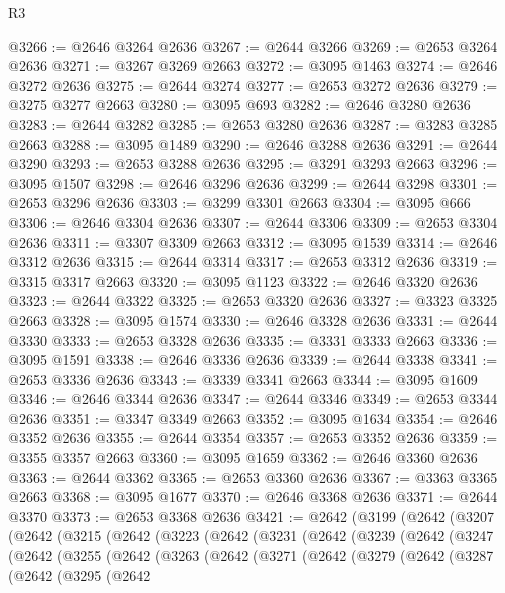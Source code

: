 \begin{lexlean}{R3}
\begin{coremodule}
@3266 := @2646 @3264 @2636
@3267 := @2644 @3266
@3269 := @2653 @3264 @2636
@3271 := @3267 @3269 @2663
@3272 := @3095 @1463
@3274 := @2646 @3272 @2636
@3275 := @2644 @3274
@3277 := @2653 @3272 @2636
@3279 := @3275 @3277 @2663
@3280 := @3095 @693
@3282 := @2646 @3280 @2636
@3283 := @2644 @3282
@3285 := @2653 @3280 @2636
@3287 := @3283 @3285 @2663
@3288 := @3095 @1489
@3290 := @2646 @3288 @2636
@3291 := @2644 @3290
@3293 := @2653 @3288 @2636
@3295 := @3291 @3293 @2663
@3296 := @3095 @1507
@3298 := @2646 @3296 @2636
@3299 := @2644 @3298
@3301 := @2653 @3296 @2636
@3303 := @3299 @3301 @2663
@3304 := @3095 @666
@3306 := @2646 @3304 @2636
@3307 := @2644 @3306
@3309 := @2653 @3304 @2636
@3311 := @3307 @3309 @2663
@3312 := @3095 @1539
@3314 := @2646 @3312 @2636
@3315 := @2644 @3314
@3317 := @2653 @3312 @2636
@3319 := @3315 @3317 @2663
@3320 := @3095 @1123
@3322 := @2646 @3320 @2636
@3323 := @2644 @3322
@3325 := @2653 @3320 @2636
@3327 := @3323 @3325 @2663
@3328 := @3095 @1574
@3330 := @2646 @3328 @2636
@3331 := @2644 @3330
@3333 := @2653 @3328 @2636
@3335 := @3331 @3333 @2663
@3336 := @3095 @1591
@3338 := @2646 @3336 @2636
@3339 := @2644 @3338
@3341 := @2653 @3336 @2636
@3343 := @3339 @3341 @2663
@3344 := @3095 @1609
@3346 := @2646 @3344 @2636
@3347 := @2644 @3346
@3349 := @2653 @3344 @2636
@3351 := @3347 @3349 @2663
@3352 := @3095 @1634
@3354 := @2646 @3352 @2636
@3355 := @2644 @3354
@3357 := @2653 @3352 @2636
@3359 := @3355 @3357 @2663
@3360 := @3095 @1659
@3362 := @2646 @3360 @2636
@3363 := @2644 @3362
@3365 := @2653 @3360 @2636
@3367 := @3363 @3365 @2663
@3368 := @3095 @1677
@3370 := @2646 @3368 @2636
@3371 := @2644 @3370
@3373 := @2653 @3368 @2636
@3421 := @2642
    (@3199
      (@2642
        (@3207
          (@2642
            (@3215
              (@2642
                (@3223
                  (@2642
                    (@3231
                      (@2642
                        (@3239
                          (@2642
                            (@3247
                              (@2642
                                (@3255
                                  (@2642
                                    (@3263
                                      (@2642
                                        (@3271
                                          (@2642
                                            (@3279
                                              (@2642
                                                (@3287
                                                  (@2642
                                                    (@3295
                                                      (@2642

\end{coremodule}
\end{lexlean}
